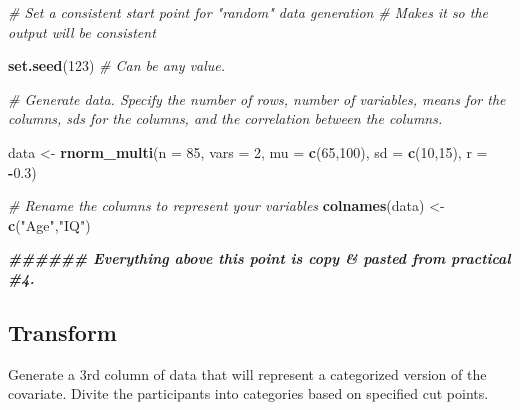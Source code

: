 \documentclass[
]{book}
\newenvironment{Shaded}{\begin{snugshade}}{\end{snugshade}}
\newcommand{\AttributeTok}[1]{\textcolor[rgb]{0.13,0.29,0.53}{#1}}
\newcommand{\CommentTok}[1]{\textcolor[rgb]{0.56,0.35,0.01}{\textit{#1}}}
\newcommand{\ConstantTok}[1]{\textcolor[rgb]{0.56,0.35,0.01}{#1}}
\newcommand{\DecValTok}[1]{\textcolor[rgb]{0.00,0.00,0.81}{#1}}
\newcommand{\DocumentationTok}[1]{\textcolor[rgb]{0.56,0.35,0.01}{\textbf{\textit{#1}}}}
\newcommand{\FloatTok}[1]{\textcolor[rgb]{0.00,0.00,0.81}{#1}}
\newcommand{\FunctionTok}[1]{\textcolor[rgb]{0.13,0.29,0.53}{\textbf{#1}}}
\newcommand{\NormalTok}[1]{#1}
\newcommand{\OtherTok}[1]{\textcolor[rgb]{0.56,0.35,0.01}{#1}}
\newcommand{\SpecialCharTok}[1]{\textcolor[rgb]{0.81,0.36,0.00}{\textbf{#1}}}
\newcommand{\StringTok}[1]{\textcolor[rgb]{0.31,0.60,0.02}{#1}}
\begin{document}
\begin{Shaded}
\begin{Highlighting}[]
\CommentTok{\# Set a consistent start point for "random" data generation}
\CommentTok{\# Makes it so the output will be consistent}

\FunctionTok{set.seed}\NormalTok{(}\DecValTok{123}\NormalTok{) }\CommentTok{\# Can be any value. }

\CommentTok{\# Generate data. Specify the number of rows, number of variables, means for the columns, sd\textquotesingle{}s for the columns, and the correlation between the columns.}

\NormalTok{data }\OtherTok{\textless{}{-}} \FunctionTok{rnorm\_multi}\NormalTok{(}\AttributeTok{n =} \DecValTok{85}\NormalTok{, }\AttributeTok{vars =} \DecValTok{2}\NormalTok{, }\AttributeTok{mu =} \FunctionTok{c}\NormalTok{(}\DecValTok{65}\NormalTok{,}\DecValTok{100}\NormalTok{), }\AttributeTok{sd =} \FunctionTok{c}\NormalTok{(}\DecValTok{10}\NormalTok{,}\DecValTok{15}\NormalTok{), }\AttributeTok{r =} \SpecialCharTok{{-}}\FloatTok{0.3}\NormalTok{)}

\CommentTok{\# Rename the columns to represent your variables }
\FunctionTok{colnames}\NormalTok{(data) }\OtherTok{\textless{}{-}} \FunctionTok{c}\NormalTok{(}\StringTok{"Age"}\NormalTok{,}\StringTok{"IQ"}\NormalTok{)}

\DocumentationTok{\#\#\#\#\#\# Everything above this point is copy \& pasted from practical \#4. }
\end{Highlighting}
\end{Shaded}

\subsection*{Transform}\label{transform}

Generate a 3rd column of data that will represent a categorized version of the covariate. Divite the participants into categories based on specified cut points.

\begin{Shaded}
\end{Shaded}
\end{document}
